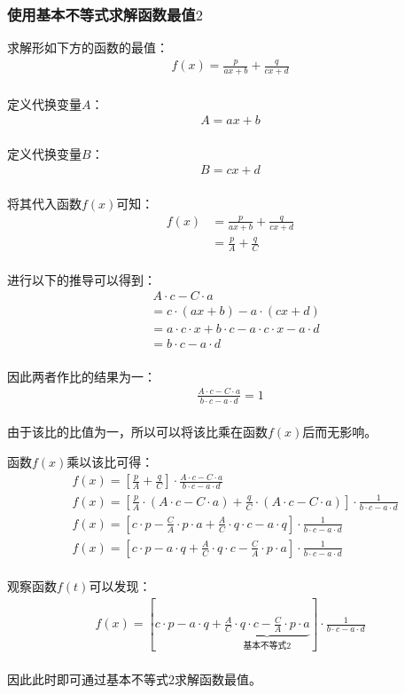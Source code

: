\documentclass[UTF8]{ctexart}
\begin{document}
\subsubsection{使用基本不等式求解函数最值$2$}
    求解形如下方的函数的最值：
    \setcounter{equation}{0}
    \begin{align}
        f(x)=\frac{p}{ax+b}+\frac{q}{cx+d}
    \end{align}\\
    定义代换变量$A$：
    \begin{align}
        A=ax+b
    \end{align}\\
    定义代换变量$B$：
    \begin{align}
        B=cx+d
    \end{align}\\
    将其代入函数$f(x)$可知：
    \begin{align}
        f(x)
        &=\frac{p}{ax+b}+\frac{q}{cx+d}\\[5mm]
        &=\frac{p}{A}+\frac{q}{C}
    \end{align}\\
    进行以下的推导可以得到：
    \begin{align}
        &~A\cdot c-C\cdot a\\[3mm]
        &=c\cdot(ax+b)-a\cdot(cx+d)\\[3mm]
        &=a\cdot c\cdot x+b\cdot c-a\cdot c\cdot x-a\cdot d\\[3mm]
        &=b\cdot c-a\cdot d
    \end{align}\\
    因此两者作比的结果为一：
    \begin{align}
        \frac{A\cdot c-C\cdot a}{b\cdot c-a\cdot d}=1
    \end{align}\\
    由于该比的比值为一，所以可以将该比乘在函数$f(x)$后而无影响。

\newpage

    函数$f(x)$乘以该比可得：
    \begin{align}
        &f(x)=\left[\frac{p}{A}+\frac{q}{C}\right]\cdot\frac{A\cdot c-C\cdot a}{b\cdot c-a\cdot d}\\[5mm]
        &f(x)=\left[\frac{p}{A}\cdot(A\cdot c-C\cdot a)+\frac{q}{C}\cdot(A\cdot c-C\cdot a)\right]\cdot\frac{1}{b\cdot c-a\cdot d}\\[5mm]
        &f(x)=\left[c\cdot p-\frac{C}{A}\cdot p\cdot a+\frac{A}{C}\cdot q\cdot c-a\cdot q\right]\cdot\frac{1}{b\cdot c-a\cdot d}\\[5mm]
        &f(x)=\left[c\cdot p-a\cdot q+\frac{A}{C}\cdot q\cdot c-\frac{C}{A}\cdot p\cdot a\right]\cdot\frac{1}{b\cdot c-a\cdot d}
    \end{align}\\
    观察函数$f(t)$可以发现：
    \begin{align}
        f(x)=\left[c\cdot p-a\cdot q+\underbrace{\frac{A}{C}\cdot q\cdot c-\frac{C}{A}\cdot p\cdot a}_{\text{基本不等式2}}\right]\cdot\frac{1}{b\cdot c-a\cdot d}
    \end{align}\\
    因此此时即可通过基本不等式$2$求解函数最值。
\end{document}
